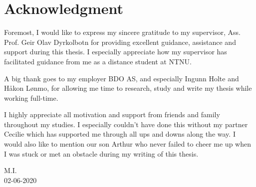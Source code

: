 \chapter*{Acknowledgment}

Foremost, I would like to express my sincere gratitude to my supervisor, Ass. Prof. Geir Olav Dyrkolbotn for providing excellent guidance, assistance and support during this thesis. I especially appreciate how my supervisor has facilitated guidance from me as a distance student at NTNU.

A big thank goes to my employer BDO AS, and especially Ingunn Holte and Håkon Lønmo, for allowing me time to research, study and write my thesis while working full-time.

I highly appreciate all motivation and support from friends and family throughout my studies. I especially couldn't have done this without my partner Cecilie which has supported me through all ups and downs along the way. I would also like to mention our son Arthur who never failed to cheer me up when I was stuck or met an obstacle during my writing of this thesis.

\begin{flushright}
M.I.\\
02-06-2020\\[1pc]
\end{flushright}